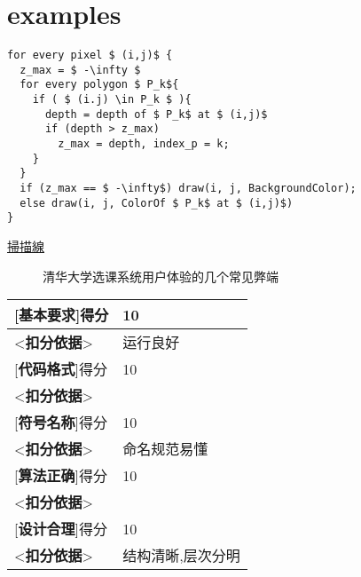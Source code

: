\section{examples}
\label{sec:exam}



	\lstset{numbers=left, numberstyle=\tiny}
\begin{lstlisting}[mathescape]
for every pixel $ (i,j)$ {
  z_max = $ -\infty $
  for every polygon $ P_k${
    if ( $ (i.j) \in P_k $ ){
      depth = depth of $ P_k$ at $ (i,j)$
      if (depth > z_max)
        z_max = depth, index_p = k;
    }
  }
  if (z_max == $ -\infty$) draw(i, j, BackgroundColor);
  else draw(i, j, ColorOf $ P_k$ at $ (i,j)$)
}
\end{lstlisting}

\hyperref[sec:exam]{掃描線}\cite[p.233]{example}


	\begin{figure*}[!t]
		\centering
		\caption{清华大学选课系统用户体验的几个常见弊端\label{fig:shortage}}
	\end{figure*}


	



\newcommand{\judgeitem}[3]{
	[{\bf #1}]得分 & #2 \\\hline
<{\bf 扣分依据}> & #3 \\\hline
}

\begin{table}[h]
	\centering
	\begin{tabular}{|l|l|}
		\hline
		\judgeitem{基本要求}{10}{运行良好}
		\judgeitem{代码格式}{10}{}
		\judgeitem{符号名称}{10}{命名规范易懂}
		\judgeitem{算法正确}{10}{}
		\judgeitem{设计合理}{10}{结构清晰,层次分明}
	\end{tabular}
\end{table}
